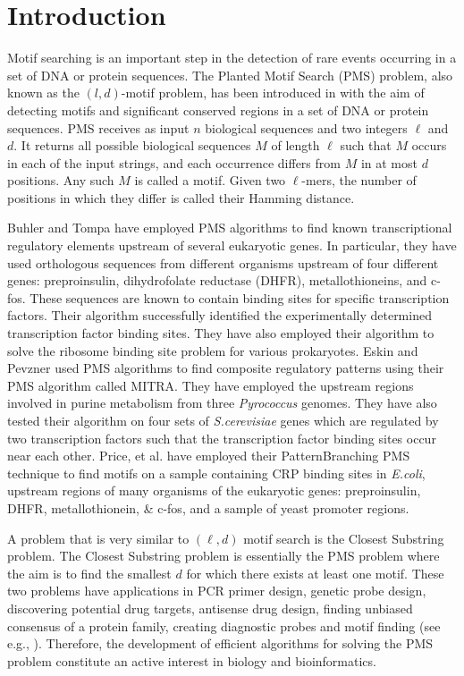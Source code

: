 \section{Introduction}
Motif searching is an important step in the detection of rare events
occurring in a set of DNA or protein sequences. The Planted Motif Search (PMS)
problem, also known as the $(l,d)$-motif problem, has been introduced in \cite{Pev00} with the aim of detecting motifs and significant
conserved regions in a set of DNA or protein sequences. PMS receives as
input $n$ biological sequences and two integers $\ell$ and $d$.
It returns all possible biological sequences $M$ of length $\ell$
such that $M$ occurs in each of the input strings, and each
occurrence differs from $M$ in at most $d$ positions. Any such
$M$ is called a motif. Given two $\ell$-mers, the number of positions in which
they differ is called their Hamming distance.

Buhler and Tompa \cite{BuTo01} have employed PMS algorithms to find known transcriptional regulatory elements upstream of several eukaryotic genes. In particular, they have used orthologous sequences from different organisms upstream of four different genes: preproinsulin, dihydrofolate reductase (DHFR), metallothioneins, and c-fos. These sequences are known to contain binding sites for specific transcription factors. Their algorithm successfully identified the experimentally determined transcription factor binding sites. 
They have also employed their algorithm to solve the ribosome binding site
problem for various prokaryotes. Eskin and Pevzner \cite{EsPe02} used PMS
algorithms to find composite regulatory patterns using their PMS algorithm
called MITRA. They have employed the upstream regions involved in purine
metabolism from three {\em Pyrococcus} genomes. They have also tested their
algorithm on four sets of {\em S.cerevisiae} genes which are regulated by two
transcription factors such that the transcription factor binding sites occur
near each other. Price, et al. \cite{PRP03}  have employed their
PatternBranching PMS technique to find motifs on a sample containing CRP binding
sites in {\em E.coli}, upstream regions of many organisms of the eukaryotic
genes:
preproinsulin, DHFR, metallothionein, \& c-fos, and a sample of yeast promoter regions.

A problem that is very similar to $(\ell,d)$ motif search is the Closest Substring problem. The
Closest Substring problem is essentially the PMS problem where the aim is to
find the smallest $d$ for which there exists at least one motif. These two problems
have applications in PCR primer design, genetic probe design, discovering
potential drug targets, antisense drug design, finding unbiased consensus of a
protein family, creating diagnostic probes and motif finding (see e.g.,
\cite{LLM+99}). Therefore, the development of efficient algorithms for solving
the PMS problem constitute an active interest in biology and bioinformatics.

